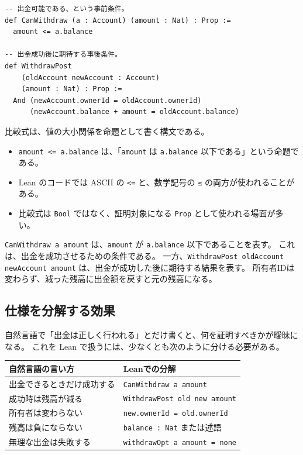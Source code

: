 \begin{listing}[htbp]
\begin{verbatim}
-- 出金可能である、という事前条件。
def CanWithdraw (a : Account) (amount : Nat) : Prop :=
  amount <= a.balance

-- 出金成功後に期待する事後条件。
def WithdrawPost
    (oldAccount newAccount : Account)
    (amount : Nat) : Prop :=
  And (newAccount.ownerId = oldAccount.ownerId)
      (newAccount.balance + amount = oldAccount.balance)
\end{verbatim}
\caption{出金の事前条件と事後条件}
\label{lst:ch04_pre_post}
\end{listing}

\begin{syntaxbox}
比較式は、値の大小関係を命題として書く構文である。
\begin{itemize}
\item \texttt{amount <= a.balance} は、「\texttt{amount} は \texttt{a.balance} 以下である」という命題である。
\item Lean のコードでは ASCII の \texttt{<=} と、数学記号の \texttt{≤} の両方が使われることがある。
\item 比較式は \texttt{Bool} ではなく、証明対象になる \texttt{Prop} として使われる場面が多い。
\end{itemize}
\end{syntaxbox}

\texttt{CanWithdraw a amount} は、\texttt{amount} が \texttt{a.balance} 以下であることを表す。
これは、出金を成功させるための条件である。
一方、\texttt{WithdrawPost oldAccount newAccount amount} は、出金が成功した後に期待する結果を表す。
所有者IDは変わらず、減った残高に出金額を戻すと元の残高になる。

\subsection{仕様を分解する効果}

自然言語で「出金は正しく行われる」とだけ書くと、何を証明すべきかが曖昧になる。
これを Lean で扱うには、少なくとも次のように分ける必要がある。

\begin{center}
\begin{tabular}{ll}
\toprule
自然言語の言い方 & Leanでの分解 \\
\midrule
出金できるときだけ成功する & \texttt{CanWithdraw a amount} \\
成功時は残高が減る & \texttt{WithdrawPost old new amount} \\
所有者は変わらない & \texttt{new.ownerId = old.ownerId} \\
残高は負にならない & \texttt{balance : Nat} または述語 \\
無理な出金は失敗する & \texttt{withdrawOpt a amount = none} \\
\bottomrule
\end{tabular}
\end{center}

